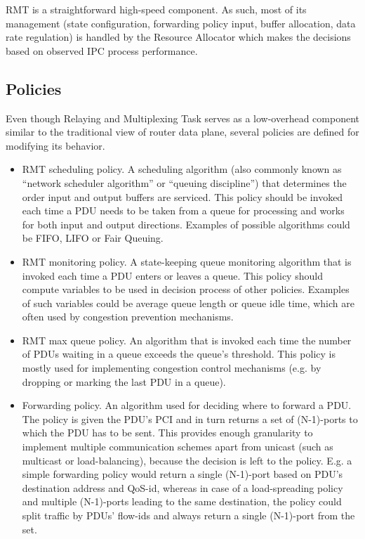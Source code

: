             RMT is a straightforward high-speed component. As such, most of its management (state configuration, forwarding policy input, buffer allocation, data rate regulation) is handled by the Resource Allocator which makes the decisions based on observed IPC process performance.


        \subsection{Policies}

            Even though Relaying and Multiplexing Task serves as a low-overhead component similar to the traditional view of router data plane, several policies are defined for modifying its behavior.

            \begin{itemize}
                \item RMT scheduling policy. A scheduling algorithm (also commonly known as ``network scheduler algorithm'' or ``queuing discipline'') that determines the order input and output buffers are serviced. This policy should be invoked each time a PDU needs to be taken from a queue for processing and works for both input and output directions. Examples of possible algorithms could be FIFO, LIFO or Fair Queuing.
                \item RMT monitoring policy. A state-keeping queue monitoring algorithm that is invoked each time a PDU enters or leaves a queue. This policy should compute variables to be used in decision process of other policies. Examples of such variables could be average queue length or queue idle time, which are often used by congestion prevention mechanisms.
                \item RMT max queue policy. An algorithm that is invoked each time the number of PDUs waiting in a queue exceeds the queue's threshold. This policy is mostly used for implementing congestion control mechanisms (e.g. by dropping or marking the last PDU in a queue).
                \item Forwarding policy. An algorithm used for deciding where to forward a PDU. The policy is given the PDU's PCI and in turn returns a set of (N-1)-ports to which the PDU has to be sent. This provides enough granularity to implement multiple communication schemes apart from unicast (such as multicast or load-balancing), because the decision is left to the policy. E.g. a simple forwarding policy would return a single (N-1)-port based on PDU's destination address and QoS-id, whereas in case of a load-spreading policy and multiple (N-1)-ports leading to the same destination, the policy could split traffic by PDUs' flow-ids and always return a single (N-1)-port from the set.
            \end{itemize}



